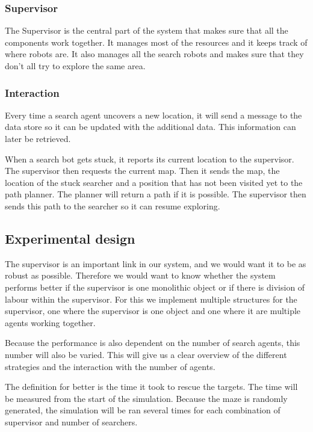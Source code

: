 \subsubsection{Supervisor}
The Supervisor is the central part of the system that makes sure that all
the components work together. It manages most of the resources and it keeps
track of where robots are. It also manages all the search robots and makes sure
that they don't all try to explore the same area.

\subsubsection{Interaction}
Every time a search agent uncovers a new location, it will send a message to
the data store so it can be updated with the additional data. This information
can later be retrieved.

When a search bot gets stuck, it reports its current location to the
supervisor. The supervisor then requests the current map. Then it sends the
map, the location of the stuck searcher and a position that has not been
visited yet to the path planner. The planner will return a path if it is
possible. The supervisor then sends this path to the searcher so it can
resume exploring.

\subsection{Experimental design}
The supervisor is an important link in our system, and we would want it to
be as robust as possible. Therefore we would want to know whether the
system performs better if the supervisor is one monolithic object or if
there is division of labour within the supervisor. For this we implement
multiple structures for the supervisor, one where the supervisor is one
object and one where it are multiple agents working together. 

Because the performance is also dependent on the number of search agents, this
number will also be varied. This will give us a clear overview of the
different strategies and the interaction with the number of agents. 

The definition for better is the time it took to rescue the targets.  The
time will be measured from the start of the simulation. Because the maze is
randomly generated, the simulation will be ran several times for each
combination of supervisor and number of searchers.
